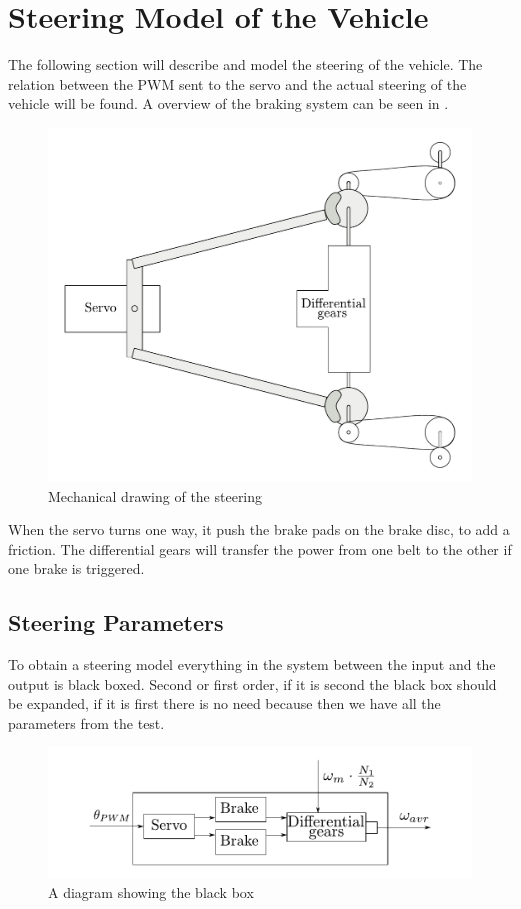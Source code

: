 \section{Steering Model of the Vehicle}\label{sec:SteeringModel}
The following section will describe and model the steering of the vehicle. The relation between the PWM sent to the servo and the actual steering of the vehicle will be found. A overview of the braking system can be seen in .

 \begin{figure}[H]
 	\centering
 	\includegraphics[scale=0.6]{figures/steeringMechanical.pdf}
 	\caption{Mechanical drawing of the steering}
 	\label{steeringMechanical}
 \end{figure}

When the servo turns one way, it push the brake pads on the brake disc, to add a friction. The differential gears will transfer the power from one belt to the other if one brake is triggered.

\subsection{Steering Parameters}
 To obtain a steering model everything in the system between the input and the output is black boxed. Second or first order, if it is second the black box should be expanded, if it is first there is no need because then we have all the parameters from the test.
 
\begin{figure}[H]
	\centering
	\includegraphics[scale=1]{figures/steeringDiagramBlackBox.pdf}
	\caption{A diagram showing the black box}
	\label{steeringDiagramBlackBox}
\end{figure}
 
 
